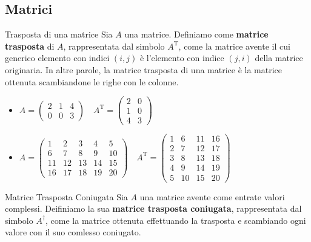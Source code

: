 \subsection{Matrici}
\begin{definition}{Trasposta di una matrice}{}
    Sia $A$ una matrice. Definiamo come \textbf{matrice trasposta} di $A$, rappresentata dal simbolo $A^{\mathrm{T}}$, come la matrice avente il cui generico elemento con indici $(i,j)$ è l'elemento con indice $(j,i)$ della matrice originaria.
    In altre parole, la matrice trasposta di una matrice è la matrice ottenuta scambiandone le righe con le colonne.
\end{definition}
\begin{example}{}{}
\begin{itemize}
    \item $A = \left(\begin{array}{ccc}
        2 & 1 & 4 \\
        0 & 0 & 3
    \end{array}\right) \quad A^{\mathrm{T}} = \left(\begin{array}       {cc}
        2 & 0 \\
        1 & 0 \\
        4 & 3
    \end{array}\right)$
    \item $A = \left(\begin{array}{ccccc}
        1 & 2 & 3 & 4 & 5 \\
        6 & 7 & 8 & 9 & 10 \\
        11 & 12 & 13 & 14 & 15 \\
        16 & 17 & 18 & 19 & 20 
    \end{array}\right) \quad A^{\mathrm{T}} = \left(\begin{array}       {cccc}
        1 & 6 & 11 &  16 \\
        2 & 7 & 12 & 17 \\
        3 & 8 & 13 & 18 \\
        4 & 9 & 14 & 19 \\ 
        5 & 10 & 15 & 20 
    \end{array}\right)$
\end{itemize}
\end{example}
\begin{definition}{Matrice Trasposta Coniugata}{}
    Sia $A$ una matrice avente come entrate valori complessi. Deifiniamo la sua \textbf{matrice trasposta coniugata}, rappresentata dal simbolo $A^{\dagger}$, come la matrice ottenuta effettuando la trasposta e scambiando ogni valore con il suo comlesso coniugato.
\end{definition}
